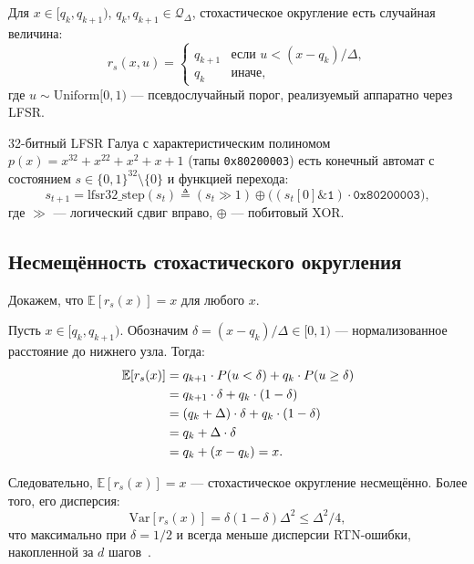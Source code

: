 \begin{definition}
\label{def:stoch-round}
Для $x \in [q_k, q_{k+1})$, $q_k, q_{k+1} \in \mathcal{Q}_\Delta$,
стохастическое округление есть случайная величина:
\[
  r_s(x, u) =
  \begin{cases}
    q_{k+1} & \text{если } u < (x - q_k)/\Delta, \\
    q_k     & \text{иначе},
  \end{cases}
\]
где $u \sim \mathrm{Uniform}[0,1)$ — псевдослучайный порог,
реализуемый аппаратно через LFSR.
\end{definition}

\begin{definition}
\label{def:galois-lfsr}
32-битный LFSR Галуа с характеристическим полиномом
$p(x) = x^{32} + x^{22} + x^2 + x + 1$ (тапы \texttt{0x80200003})
есть конечный автомат с состоянием $s \in \{0,1\}^{32} \setminus \{0\}$
и функцией перехода:
\[
  s_{t+1} = \mathrm{lfsr32\_step}(s_t)
  \triangleq (s_t \gg 1) \oplus
  \bigl((s_t[0] \mathbin{\&} \texttt{1}) \cdot \texttt{0x80200003}\bigr),
\]
где $\gg$ — логический сдвиг вправо, $\oplus$ — побитовый XOR.
\end{definition}

\subsection{Несмещённость стохастического округления}
\label{ssec:glava88-unbiased-proof}

Докажем, что $\mathbb{E}[r_s(x)] = x$ для любого $x$.

Пусть $x \in [q_k, q_{k+1})$.  Обозначим
$\delta = (x - q_k)/\Delta \in [0, 1)$ — нормализованное расстояние
до нижнего узла.  Тогда:
\begin{align}
  \mathbb{E}[r_s(x)] &= q_{k+1} \cdot P(u < \delta) + q_k \cdot P(u \geq \delta)
  \notag \\
  &= q_{k+1} \cdot \delta + q_k \cdot (1 - \delta)
  \notag \\
  &= (q_k + \Delta) \cdot \delta + q_k \cdot (1 - \delta)
  \notag \\
  &= q_k + \Delta \cdot \delta
  \notag \\
  &= q_k + (x - q_k) = x. \label{eq:unbiased-proof}
\end{align}

Следовательно, $\mathbb{E}[r_s(x)] = x$ — стохастическое округление
несмещённо.  Более того, его дисперсия:
\begin{equation}
  \mathrm{Var}[r_s(x)] = \delta(1-\delta)\Delta^2 \leq \Delta^2/4,
  \label{eq:sr-variance}
\end{equation}
что максимально при $\delta = 1/2$ и всегда меньше дисперсии
RTN-ошибки, накопленной за $d$ шагов~\cite{gupta2015}.

